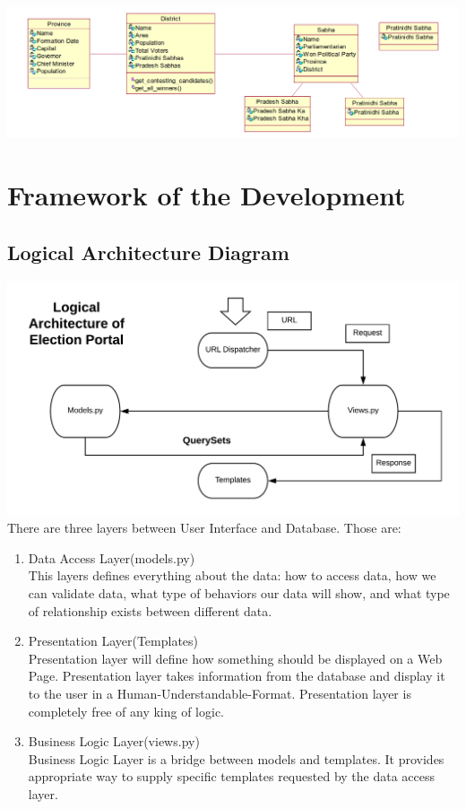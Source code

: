 \documentclass[12pt]{article}
\begin{document}
\begin{center}
\includegraphics[scale=0.5]{Political_division.png}
\end{center}


\section{Framework of the Development}
\subsection{Logical Architecture Diagram}
\includegraphics[scale=0.8]{Logical_Architecture.png}\\
There are three layers between User Interface and Database. Those are:
\begin{enumerate}
\item Data Access Layer(models.py)\\
This layers defines everything about the data: how to access data, how we can validate data, what type of behaviors our data will show, and what type of relationship exists between different data.
\item Presentation Layer(Templates)\\
Presentation layer will define how something should be displayed on a Web Page. Presentation layer takes information from the database and display it to the user in a Human-Understandable-Format. Presentation layer is completely free of any king of logic.
\item Business Logic Layer(views.py)\\
Business Logic Layer is a bridge between models and templates. It provides appropriate way to supply specific templates requested by the data access layer.
\end{enumerate}
\newpage
\end{document}
